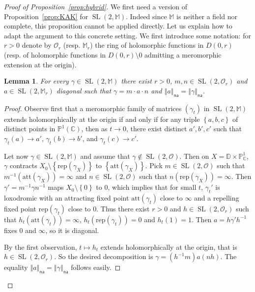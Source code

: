 \documentclass[11pt]{article}
\newtheorem{lemm}[theo]{Lemma}
\theoremstyle{definition}
\numberwithin{equation}{section}
\numberwithin{figure}{section}
\numberwithin{table}{section}
\DeclareMathOperator{\SL}{SL}
\newcommand{\cc}{\mathbb{C}}
\newcommand{\dD}{\mathbb{D}}
\newcommand{\mm}{\mathbb{M}}
\newcommand{\set}[1]{\left\{#1\right\}}
\newcommand{\norm}[1]{\left\Vert#1\right\Vert}
\newcommand{\pu}{{\mathbb{P}^1}}
\newcommand{\PP}{\mathbb{P}}
\newcommand{\att}{\mathrm{att}}
\newcommand{\rep}{\mathrm{rep}}
\newcommand{\na}{\mathsf{na}}
\newcommand{\inv}{^{-1}}
\begin{document}
\begin{proof}[Proof of Proposition~\ref{prop:hybrid}]
We first need a version of Proposition~\ref{prop:KAK} for $\SL(2, \mm)$. Indeed since $\mm$ is neither a field nor complete, this proposition cannot be applied directly. Let us explain how to adapt the argument to this concrete setting. We first introduce some notation: for $r>0$ denote by $\mathcal{O}_r$ (resp. $\mm_r$) the ring of holomorphic functions in $D(0, r)$ (resp. of holomorphic functions in $D(0, r)\setminus {0}$ admitting a meromorphic extension at the origin).

\begin{lemm}\label{lem:KAK holomorphe}
For every $\gamma\in \SL(2, \mm)$ there exist $r>0$, $m,n \in \SL(2,\mathcal{O}_r)$ and $a \in \SL(2, \mm_r)$ diagonal such that $\gamma= m\cdot a \cdot n$ and $\norm{a}_\na = \norm{\gamma}_\na$.
\end{lemm}

\begin{proof}
Observe first that a meromorphic family of matrices $(\gamma_t)$ in $\SL(2, \mm)$ extends holomorphically at the origin if and only if for any triple $\set{a,b,c}$ of distinct points in $\pu(\cc)$, then as $t\to 0$, there exist distinct $a',b',c'$ such that $\gamma_t(a)\to a'$, $\gamma_t(b)\to b'$, and $\gamma_t(c)\to c'$.

Let now $\gamma\in \SL(2, \mm)$ and assume that $\gamma\notin\SL(2, \mathcal{O})$. Then on $X = \dD\times \PP^1_\cc$, $\gamma$ contracts $X_0\setminus\set{\rep(\gamma_X)}$ to $\set{\att(\gamma_X)}$. Pick $m\in \SL(2, \mathcal{O})$ such that $m\inv(\att(\gamma_X)) = \infty$ and $n\in \SL(2, \mathcal{O})$ such that $n(\rep(\gamma_X)) = \infty$. Then $\gamma' = m\inv\gamma n\inv$ maps $X_0\setminus\set{0}$ to $0$, which implies that for small $t$, $\gamma_t'$ is loxodromic with an attracting fixed point $\att(\gamma_t)$ close to $\infty$ and a repelling fixed point $\rep(\gamma_t)$ close to $0$. Thus there exist $r>0$ and $h\in \SL(2, \mathcal{O}_r)$ such that $h_t(\att(\gamma_t)) =\infty$, $h_t(\rep(\gamma_t)) = 0$ and $h_t(1) =1$. Then $a= h\gamma'h^{-1}$ fixes 0 and $\infty$, so it is diagonal.

By the first observation, $t\mapsto h_t$ extends holomorphically at the origin, that is $h\in \SL(2, \mathcal{O}_r)$. So the desired decomposition is $\gamma = (h\inv m) a (n h)$. The equality $\norm{a}_\na = \norm{\gamma}_\na$ follows easily.
\end{proof}


\end{proof}
\end{document}

